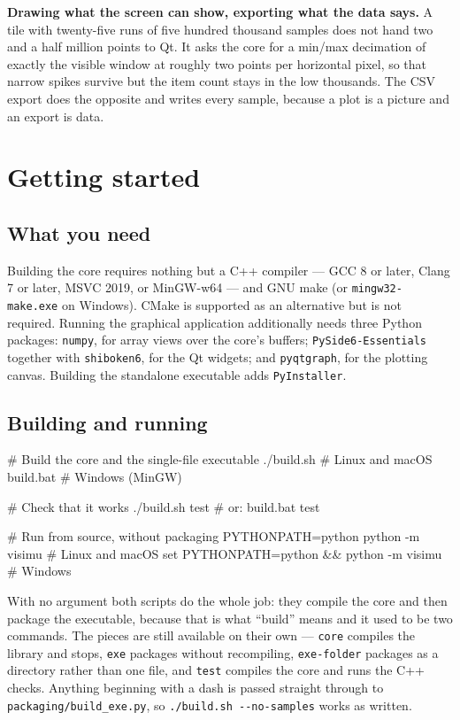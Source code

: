 \documentclass[11pt,a4paper,oneside]{report}
\newcommand{\code}[1]{\texttt{#1}}
\begin{document}
\textbf{Drawing what the screen can show, exporting what the data says.} A tile
with twenty-five runs of five hundred thousand samples does not hand two and a
half million points to Qt. It asks the core for a min/max decimation of exactly
the visible window at roughly two points per horizontal pixel, so that narrow
spikes survive but the item count stays in the low thousands. The CSV export
does the opposite and writes every sample, because a plot is a picture and an
export is data.

\chapter{Getting started}

\section{What you need}

Building the core requires nothing but a C++ compiler --- GCC 8 or later, Clang
7 or later, MSVC 2019, or MinGW-w64 --- and GNU make (or
\code{mingw32-make.exe} on Windows). CMake is supported as an alternative but
is not required. Running the graphical application additionally needs three
Python packages: \code{numpy}, for array views over the core's buffers;
\code{PySide6-Essentials} together with \code{shiboken6}, for the Qt widgets;
and \code{pyqtgraph}, for the plotting canvas. Building the standalone
executable adds \code{PyInstaller}.

\section{Building and running}

\begin{aoecode}
# Build the core and the single-file executable
./build.sh                  # Linux and macOS
build.bat                   # Windows (MinGW)

# Check that it works
./build.sh test             # or: build.bat test

# Run from source, without packaging
PYTHONPATH=python python -m visimu                # Linux and macOS
set PYTHONPATH=python && python -m visimu         # Windows
\end{aoecode}

With no argument both scripts do the whole job: they compile the core and then
package the executable, because that is what ``build'' means and it used to be
two commands. The pieces are still available on their own ---
\code{core} compiles the library and stops, \code{exe} packages without
recompiling, \code{exe-folder} packages as a directory rather than one file,
and \code{test} compiles the core and runs the C++ checks. Anything beginning
with a dash is passed straight through to \code{packaging/build\_exe.py}, so
\code{./build.sh -{}-no-samples} works as written.
\end{document}
